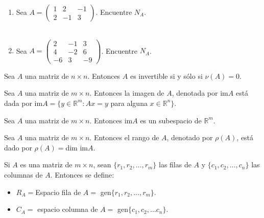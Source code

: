 \begin{ejem}
\begin{enumerate}
    \item 
    Sea $A = \begin{pmatrix} 1 & 2 & -1 \\ 2 & -1 & 3 \end{pmatrix}$. Encuentre $N_A$.
\\\

\item
Sea $A = \begin{pmatrix} 2 & -1 & 3 \\ 4 & -2 & 6 \\ -6 & 3 & -9 \end{pmatrix}$. Encuentre $N_A$.
\end{enumerate}
\end{ejem}

\begin{thm}
Sea $A$ una matriz de $n \times n$. Entonces $A$ es invertible si y sólo si $\nu (A) = 0$.
\end{thm}



\begin{defin}
Sea $A$ una matriz de $m \times n$. Entonces la imagen de $A$, denotada por im$A$ está dada por im$A = \{ y \in \mathbb{R}^m : Ax = y$ para alguna $x \in \mathbb{R}^n \}$.
\end{defin}

\begin{thm}
Sea $A$ una matriz de $m \times n$. Entonces im$A$ es un subespacio de $\mathbb{R}^m$.
\end{thm}

\begin{defin}
Sea $A$ una matriz de $m \times n$. Entonces el rango de $A$, denotado por $\rho (A)$, está dado por $\rho (A) = $dim im$A$.
\end{defin}





\begin{defin}
Si $A$ es una matriz de $m \times n$, sean $\{ r_1, r_2, \dots, r_m \} $ las filas de $A$ y $\{ c_1, c_2, \dots, c_n \}$ las columnas de $A$. Entonces se define: 
\begin{itemize}
    \item 
    $R_A = $Espacio fila de $A =$ gen$ \{ r_1, r_2, \dots, r_m \}$.
    
    \item
     $C_A =$ espacio columna de $A = $ gen$\{ c_1,c_2, \dots c_n \}$. 
\end{itemize}
\end{defin}
    
